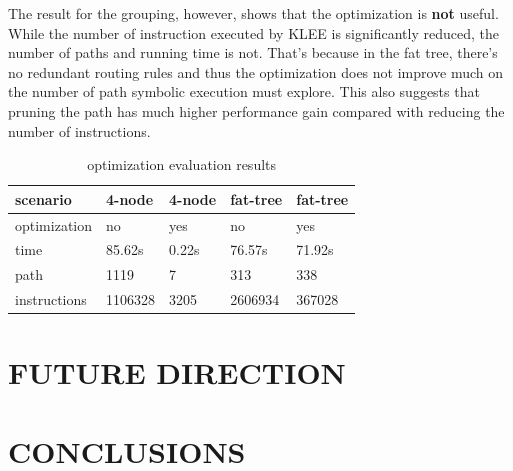 \documentclass[letterpaper, 10 pt, conference]{ieeeconf}  %
\begin{document}
The result for the grouping, however, shows that the optimization is \textbf{not} useful. While the number of instruction executed by KLEE is significantly reduced, the number of paths and running time is not. That's because in the fat tree, there's no redundant routing rules and thus the optimization does not improve much on the number of path symbolic execution must explore. This also suggests that pruning the path has much higher performance gain compared with reducing the number of instructions.
\begin{table}[!ht]
	\centering
	\begin{tabular}{|l|l|l|l|l|}
		\hline
		scenario & 4-node & 4-node & fat-tree & fat-tree  \\ \hline
		optimization & no & yes & no & yes  \\ \hline
		time & 85.62s & 0.22s & 76.57s & 71.92s \\ \hline
		path & 1119 & 7 & 313 & 338 \\ \hline
		instructions & 1106328 & 3205 & 2606934 & 367028 \\ \hline
	\end{tabular}
	\caption{optimization evaluation results}
	\label{tab:eval-opt}
\end{table}

\section{FUTURE DIRECTION}\label{sec:fd}

\section{CONCLUSIONS}\label{sec:c}




\addtolength{\textheight}{-12cm}  


\end{document}
